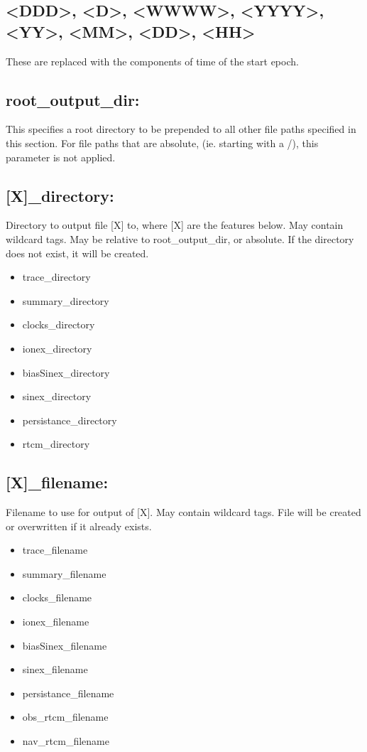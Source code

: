 \subsection*
{\textless DDD\textgreater,
\textless D\textgreater, 
\textless WWWW\textgreater, 
\textless YYYY\textgreater, 
\textless YY\textgreater, 
\textless MM\textgreater, 
\textless DD\textgreater, 
\textless HH\textgreater}
These are replaced with the components of time of the start epoch.


\subsection*{root\_output\_dir:}
This specifies a root directory to be prepended to all other file paths specified in this section. For file paths that are absolute, (ie. starting with a /), this parameter is not applied.

\subsection*{[X]\_directory:}
Directory to output file [X] to, where [X] are the features below. May contain wildcard tags. May be relative to root\_output\_dir, or absolute. If the directory does not exist, it will be created.

\begin{itemize}
\item trace\_directory
\item summary\_directory
\item clocks\_directory
\item ionex\_directory
\item biasSinex\_directory
\item sinex\_directory
\item persistance\_directory
\item rtcm\_directory
\end{itemize}

\subsection*{[X]\_filename:}
Filename to use for output of [X]. May contain wildcard tags. File will be created or overwritten if it already exists.

\begin{itemize}
\item trace\_filename
\item summary\_filename
\item clocks\_filename
\item ionex\_filename
\item biasSinex\_filename
\item sinex\_filename
\item persistance\_filename
\item obs\_rtcm\_filename
\item nav\_rtcm\_filename
\end{itemize}

